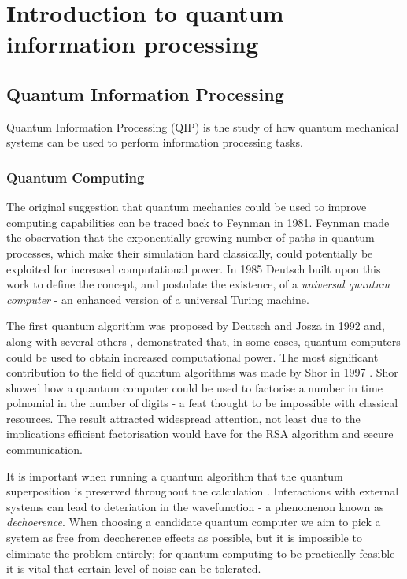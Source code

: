 \chapter{Introduction to quantum information processing} 
\label{ch:Introduction}

\section{Quantum Information Processing}

Quantum Information Processing (QIP) is the study of how quantum mechanical systems can be used to perform information processing tasks. 

\subsection{Quantum Computing}

The original suggestion that quantum mechanics could be used to improve computing capabilities can be traced back to Feynman \cite{feynman_82} in 1981. Feynman made the observation that the exponentially growing number of paths in quantum processes, which make their simulation hard classically, could potentially be exploited for increased computational power. In 1985 Deutsch built upon this work to define the concept, and postulate the existence, of a \textit{universal quantum computer}\cite{deutsch_85} - an enhanced version of a universal Turing machine. 

The first quantum algorithm was proposed by Deutsch and Josza \cite{deutsch_jozsa_92} in 1992 and, along with several others \cite{simon_94, grovers_search}, demonstrated that, in some cases, quantum computers could be used to obtain increased computational power. The most significant contribution to the field of quantum algorithms was made by Shor in 1997 \cite{shors_algorithm}. Shor showed how a quantum computer could be used to factorise a number in time polnomial in the number of digits - a feat thought to be impossible with classical resources. The result attracted widespread attention, not least due to the implications efficient factorisation would have for the RSA algorithm \cite{rsa} and secure communication.

It is important when running a quantum algorithm that the quantum superposition is preserved throughout the calculation \cite{nature_cq_review_10}. Interactions with external systems can lead to deteriation in the wavefunction - a phenomenon known as \textit{dechoerence}. When choosing a candidate quantum computer we aim to pick a system as free from decoherence effects as possible, but it is impossible to eliminate the problem entirely; for quantum computing to be practically feasible it is vital that certain level of noise can be tolerated. 


